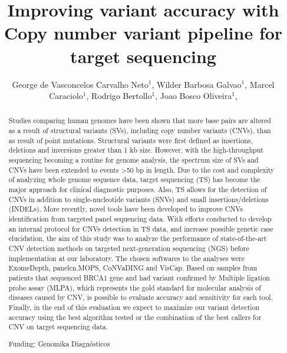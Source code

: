 \documentclass[twoside]{article}
\title{\vspace{-15mm}\fontsize{24pt}{10pt}\selectfont\textbf{ Improving variant accuracy with Copy number variant pipeline for target sequencing }} %
\author{ George de Vasconcelos Carvalho Neto$^{1}$, Wilder Barbosa Galvao$^{1}$, Marcel Caraciolo$^{1}$, Rodrigo Bertollo$^{1}$, Joao Bosco Oliveira$^{1}$, }
\affil{ 1 Genomika

 }
\date{}
\begin{document}
  
  
  \maketitle %
  
  
  \thispagestyle{fancy} %
  
  
  \begin{abstract}
  Studies comparing human genomes have been shown that more base pairs are altered as a result of structural variants (SVs), including copy number variants (CNVs), than as result of point mutations. Structural variants were first defined as insertions, deletions and inversions greater than 1 kb size. However, with the high-throughput sequencing becoming a routine for genome analysis, the spectrum size of SVs and CNVs have been extended to events >50 bp in length. Due to the cost and complexity of analyzing whole genome sequence data, target sequencing (TS) has become the major approach for clinical diagnostic purposes. Also, TS allows for the detection of CNVs in addition to single-nucleotide variants (SNVs) and small insertions/deletions (INDELs). More recently, novel tools have been developed to improve CNVs identification from targeted panel sequencing data. With efforts conducted to develop an internal protocol for CNVs detection in TS data, and increase possible genetic case elucidation, the aim of this study was to analyze the performance of state-of-the-art CNV detection methods on targeted next-generation sequencing (NGS) before implementation at our laboratory. The chosen softwares to the analyses were ExomeDepth, panelcn.MOPS, CoNVaDING and VisCap. Based on samples from patients that sequenced BRCA1 gene and had variant confirmed by Multiple ligation probe assay (MLPA), which  represents the gold standard for molecular analysis of diseases caused by CNV, is possible to evaluate accuracy and sensitivity for each tool. Finally, in the end of this evaluation we expect to maximize our variant detection accuracy using the best algorithm tested or the combination of the best callers for CNV on target sequencing data.
  
  Funding: Genomika Diagn\'osticos \\ 
  \end{abstract}
  
\end{document}
